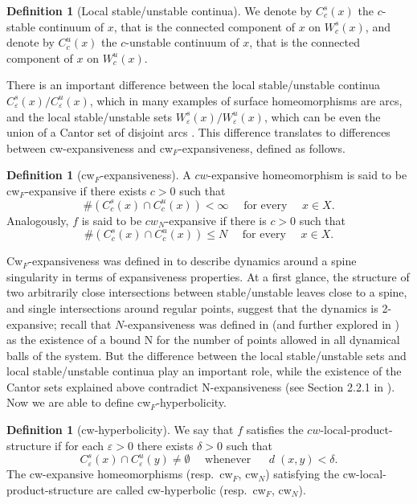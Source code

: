 \documentclass{amsart}
\theoremstyle{plain}
\theoremstyle{definition}
\newtheorem{definition}[theorem]{Definition}
\newcommand{\eps}{\varepsilon}
\newcommand{\dist}{\operatorname{\textit{d}}}
\begin{document}
\begin{definition}[Local stable/unstable continua]
We denote by $C^s_c(x)$ the $c$-stable continuum of $x$, that is the connected component of $x$ on $W^s_{c}(x)$, and denote by $C^u_c(x)$ the $c$-unstable continuum of $x$, that is the connected component of $x$ on $W^u_{c}(x)$.
\end{definition}

There is an important difference between the local stable/unstable continua $C^s_{\eps}(x)/ C^u_{\eps}(x)$, which in many examples of surface homeomorphisms are arcs, and the local stable/unstable sets $W^s_{\eps}(x)/ W^u_{\eps}(x)$, which can be even the union of a Cantor set of disjoint arcs \cite{ArD}. This difference translates to differences between cw-expansiveness and cw$_F$-expansiveness, defined as follows.

\begin{definition}[cw$_F$-expansiveness]\label{cwf}
A $cw$-expansive homeomorphism is said to be cw$_F$-expansive if there exists $c>0$ such that $$\#(C^s_c(x)\cap C^u_c(x))<\infty \quad \text{ for every } \quad x\in X.$$ Analogously, $f$ is said to be $cw_N$-expansive if there is $c>0$ such that $$\#(C^s_c(x)\cap C^u_c(x))\leq N \quad \text{ for every } \quad x\in X.$$    
\end{definition}

Cw$_F$-expansiveness was defined in \cite{ArD} to describe dynamics around a spine singularity in terms of expansiveness properties. At a first glance, the structure of two arbitrarily close intersections between stable/unstable leaves close to a spine, and single intersections around regular points, suggest that the dynamics is 2-expansive; recall that $N$-expansiveness was defined in \cite{Mor} (and further explored in \cites{Artrobn,APV,CC,CC2,LZ}) as the existence of a bound N for the number of points allowed in all dynamical balls of the system. But the difference between the local stable/unstable sets and local stable/unstable continua play an important role, while the existence of the Cantor sets explained above contradict N-expansiveness (see Section 2.2.1 in \cite{ArD}). Now we are able to define cw$_F$-hyperbolicity.

\begin{definition}[cw-hyperbolicity]\label{cwfh}
We say that $f$ satisfies the $cw$-local-product-structure if for each $\eps>0$ there exists $\delta>0$ such that $$C^s_\eps(x)\cap C^u_\eps(y)\neq \emptyset \quad \text{ whenever } \quad \dist(x,y)< \delta.$$ The cw-expansive homeomorphisms (resp.\ cw$_F$, cw$_N$) satisfying the cw-local-product-structure are called cw-hyperbolic (resp.\ cw$_F$, cw$_N$).
\end{definition}
\end{document}
